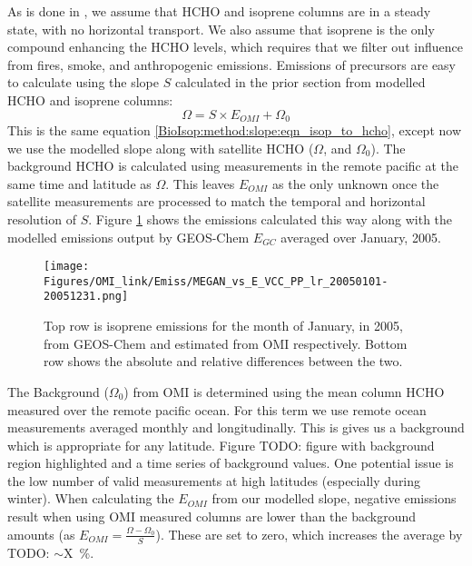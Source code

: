     As is done in \textcite{Palmer2003, Millet2006, Bauwens2016}, we assume that HCHO and isoprene columns are in a steady state, with no horizontal transport.
    We also assume that isoprene is the only compound enhancing the HCHO levels, which requires that we filter out influence from fires, smoke, and anthropogenic emissions.
    Emissions of precursors are easy to calculate using the slope $S$ calculated in the prior section from modelled HCHO and isoprene columns:
    \begin{equation*}
    \Omega = S \times E_{OMI} + \Omega_0
    \end{equation*}
    This is the same equation \ref{BioIsop:method:slope:eqn_isop_to_hcho}, except now we use the modelled slope along with satellite HCHO ($\Omega$, and $\Omega_0$).
    The background HCHO is calculated using measurements in the remote pacific at the same time and latitude as $\Omega$.
    This leaves $E_{OMI}$ as the only unknown once the satellite measurements are processed to match the temporal and horizontal resolution of $S$.
    Figure \ref{BioIsop:method:calculation:fig_E_isop_200501} shows the emissions calculated this way along with the modelled emissions output by GEOS-Chem $E_{GC}$ averaged over January, 2005.
    \begin{figure}
      \texttt{[image: Figures/OMI\_link/Emiss/MEGAN\_vs\_E\_VCC\_PP\_lr\_20050101-20051231.png]}
      \caption{%
        Top row is isoprene emissions for the month of January, in 2005, from GEOS-Chem and estimated from OMI respectively.
        Bottom row shows the absolute and relative differences between the two.
      }
      \label{BioIsop:method:calculation:fig_E_isop_200501}
    \end{figure}
    
    The Background ($\Omega_0$) from OMI is determined using the mean column HCHO measured over the remote pacific ocean.
    For this term we use remote ocean measurements averaged monthly and longitudinally.
    This is gives us a background which is appropriate for any latitude.
    Figure TODO: figure with background region highlighted and a time series of background values.
    One potential issue is the low number of valid measurements at high latitudes (especially during winter).
    When calculating the $E_{OMI}$ from our modelled slope, negative emissions result when using OMI measured columns are lower than the background amounts (as $E_{OMI} = \frac{\Omega - \Omega_0}{S}$).
    These are set to zero, which increases the average by TODO: $\sim$X~\%.
    
